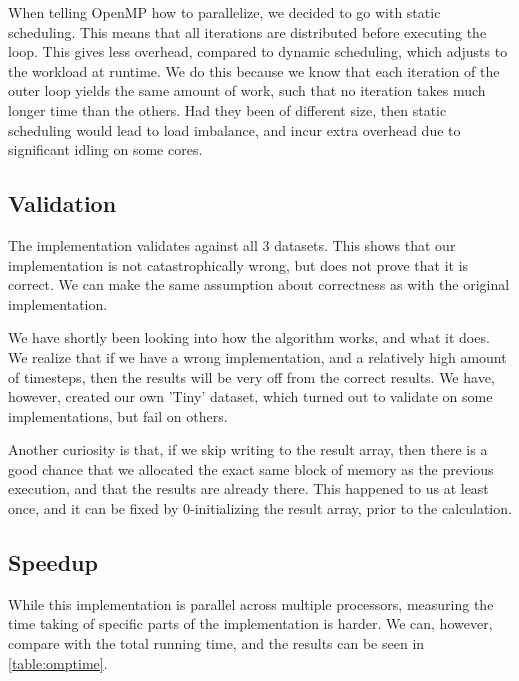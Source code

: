 \documentclass[11pt]{article}
\begin{document}
When telling OpenMP how to parallelize, we decided to go with static scheduling.
This means that all iterations are distributed before executing the loop. This gives
less overhead, compared to dynamic scheduling, which adjusts to the workload at runtime. We do
this because we know that each iteration of the outer loop yields the same
amount of work, such that no iteration takes much longer time than the others.
Had they been of different size, then static scheduling would lead to load 
imbalance, and incur extra overhead due to significant idling on some cores.


\subsection{Validation}
The implementation validates against all 3 datasets. This shows that our
implementation is not catastrophically wrong, but does not prove that it is
correct. We can make the same assumption about correctness as with the 
original implementation.

We have shortly been looking into how the algorithm works, and what it does. We
realize that if we have a wrong implementation, and a relatively high amount of 
timesteps, then the results will be very off from the correct results. We have,
however, created our own 'Tiny' dataset, which turned out to validate on some
implementations, but fail on others.

Another curiosity is that, if we skip writing to the result array, then there
is a good chance that we allocated the exact same block of memory as the 
previous execution, and that the results are already there. This happened to us
at least once, and it can be fixed by 0-initializing the result array, prior to
the calculation.


\subsection{Speedup}
While this implementation is parallel across multiple processors, measuring the
time taking of specific parts of the implementation is harder. We can, however, 
compare with the total running time, and the results can be seen in 
\autoref{table:omptime}.

\begin{table}[h]
\centering
{}
\caption{Speedup comparison of the original implementation and the OpenMP implementation}
\label{table:omptime}
\end{table}
\end{document}
